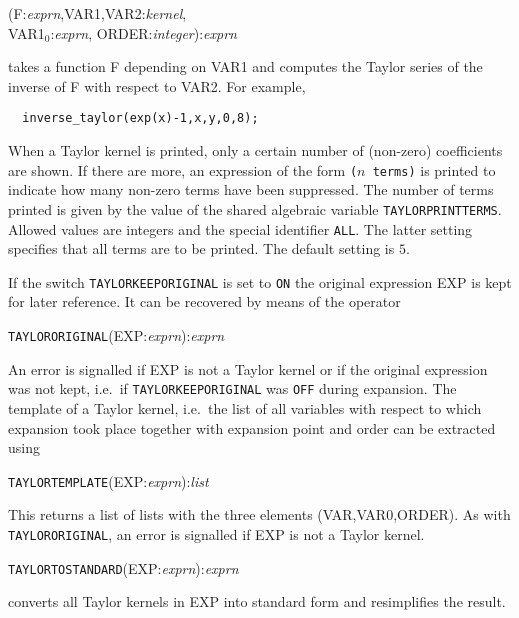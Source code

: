 (F:{\em exprn},VAR1,VAR2:{\em kernel},\\
VAR1$_0$:{\em exprn},
                                 ORDER:{\em integer}):{\em exprn}

takes a function F depending on VAR1 and computes the Taylor series of
the inverse of F with respect to VAR2. For example,

\begin{verbatim}
  inverse_taylor(exp(x)-1,x,y,0,8);
\end{verbatim}


When a Taylor kernel is printed, only a certain number of (non-zero)
coefficients are shown. If there are more, an expression of the form
\verb|(|$n$\verb| terms)| is printed to indicate how many non-zero
terms have been suppressed. The number of terms printed is given by
the value of the shared algebraic variable \verb|TAYLORPRINTTERMS|.
Allowed values are integers and the special identifier \verb|ALL|. The
latter setting specifies that all terms are to be printed. The default
setting is $5$.


If the switch \verb|TAYLORKEEPORIGINAL| is set to \verb|ON| the
original expression EXP is kept for later reference.
It can be recovered by means of the operator

\hspace*{2em} {\tt TAYLORORIGINAL}(EXP:{\em exprn}):{\em exprn}

An error is signalled if EXP is not a Taylor kernel or if the original
expression was not kept, i.e.\ if \verb|TAYLORKEEPORIGINAL| was
\verb|OFF| during expansion.  The template of a Taylor kernel, i.e.\
the list of all variables with respect to which expansion took place
together with expansion point and order can be extracted using

\hspace*{2em} {\tt TAYLORTEMPLATE}(EXP:{\em exprn}):{\em list}

This returns a list of lists with the three elements (VAR,VAR0,ORDER).
As with \verb|TAYLORORIGINAL|,
an error is signalled if EXP is not a Taylor kernel.

\hspace*{2em} {\tt TAYLORTOSTANDARD}(EXP:{\em exprn}):{\em exprn}

converts all Taylor kernels in EXP into standard form and
 resimplifies the result.


